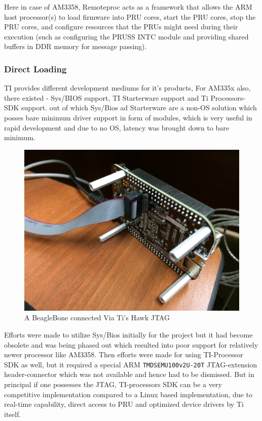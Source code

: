  Here in case of AM3358, Remoteproc acts as a framework that allows the ARM host processor(s) to load firmware into PRU cores, start the PRU cores, stop the PRU cores, and configure resources that the PRUs might need during their execution (such as configuring the PRUSS INTC module and providing shared buffers in DDR memory for message passing).

\subsubsection{Direct Loading}
TI provides different development mediums for it's products, For  AM335x also, there existed - Sys/BIOS support, TI Starterware support and Ti Processors-SDK support. out of which Sys/Bios ad Starterware are a non-OS solution which posses bare minimum driver support in form of modules, which is very useful in rapid development and due to no OS, latency was brought down to bare minimum.
\begin{figure}[h]
	\centering
	\includegraphics[width=\textwidth/2]{fig/bbb_jtag.jpg}
	\caption{A BeagleBone connected Via Ti's Hawk JTAG}
\end{figure}

Efforts were made to utilize Sys/Bios initially for the project but it had become obsolete and was being phased out which resulted into poor support for relatively newer processor like AM3358. Then efforts were made for using TI-Processor SDK as well, but it required a special ARM \texttt{TMDSEMU100v2U-20T} JTAG-extension header-connector which was not available and hence had to be dismissed. But in principal if one possesses the JTAG, TI-processors SDK can be a very competitive implementation compared to a Linux based implementation, due to real-time capability, direct access to PRU and optimized device drivers by Ti itself.


